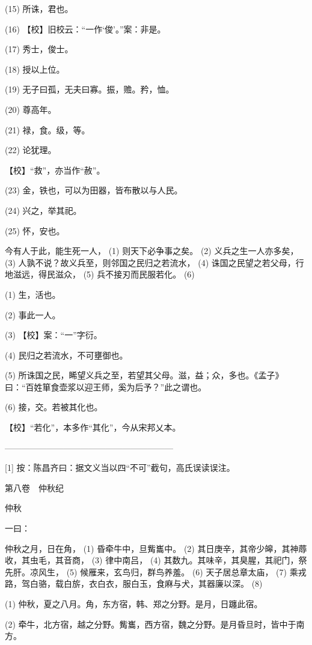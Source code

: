 \documentclass[12pt,UTF8]{ctexbook}
\begin{document}
(15) 所诛，君也。

(16) 【校】旧校云：“一作‘俊’。”案：非是。

(17) 秀士，俊士。

(18) 授以上位。

(19) 无子曰孤，无夫曰寡。振，赡。矜，恤。

(20) 尊高年。

(21) 禄，食。级，等。

(22) 论犹理。

【校】“救”，亦当作“赦”。

(23) 金，铁也，可以为田器，皆布散以与人民。

(24) 兴之，举其祀。

(25) 怀，安也。

今有人于此，能生死一人， (1) 则天下必争事之矣。 (2) 义兵之生一人亦多矣， (3) 人孰不说？故义兵至，则邻国之民归之若流水， (4) 诛国之民望之若父母，行地滋远，得民滋众， (5) 兵不接刃而民服若化。 (6)

(1) 生，活也。

(2) 事此一人。

(3) 【校】案：“一”字衍。

(4) 民归之若流水，不可壅御也。

(5) 所诛国之民，睎望义兵之至，若望其父母。滋，益；众，多也。《孟子》曰：“百姓箪食壶浆以迎王师，奚为后予？”此之谓也。

(6) 接，交。若被其化也。

【校】“若化”，本多作“其化”，今从宋邦乂本。




————————————————————

[1] 按：陈昌齐曰：据文义当以四“不可”截句，高氏误读误注。





第八卷　仲秋纪



仲秋


一曰：

仲秋之月，日在角， (1) 昏牵牛中，旦觜巂中。 (2) 其日庚辛，其帝少皞，其神蓐收，其虫毛，其音商， (3) 律中南吕， (4) 其数九。其味辛，其臭腥，其祀门，祭先肝。凉风生， (5) 候雁来，玄鸟归，群鸟养羞。 (6) 天子居总章太庙， (7) 乘戎路，驾白骆，载白旂，衣白衣，服白玉，食麻与犬，其器廉以深。 (8)

(1) 仲秋，夏之八月。角，东方宿，韩、郑之分野。是月，日躔此宿。

(2) 牵牛，北方宿，越之分野。觜巂，西方宿，魏之分野。是月昏旦时，皆中于南方。
\end{document}
